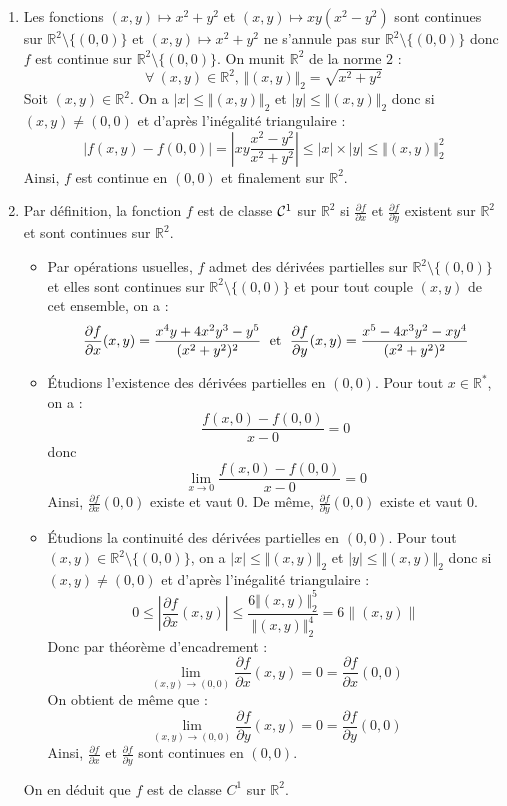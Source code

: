 \documentclass[a4paper,twoside,french,11pt]{VcCours}
\begin{document}
 \begin{enumerate}
 \item Les fonctions $(x,y)\mapsto x^2+y^2$ et $(x,y)\mapsto xy(x^2-y^2)$ sont continues sur  $\mathbb{R}^2 \setminus \{(0,0)\}$ et $(x,y)\mapsto x^2+y^2$ ne s'annule pas sur $\mathbb{R}^2 \setminus \{(0,0)\}$ donc $f$ est continue sur $\mathbb{R}^2\setminus\{(0,0)\}$. On munit $\mathbb{R}^2$ de la norme $2$ :
$$\forall\:(x,y)\in\mathbb{R}^2, \,  \Vert (x,y) \Vert_2 = \sqrt{x^2+y^2}$$
Soit $(x,y)\in\mathbb{R}^2$. On a $|x|\leq \Vert (x,y) \Vert_2$ et $|y|\leq \Vert (x,y) \Vert_2$ donc si $(x,y) \neq (0,0)$ et d'après l'inégalité triangulaire :
$$|f(x,y)-f(0,0)|=\left|xy\frac{x^2-y^2}{x^2+y^2}\right| \leq |x| \times |y|\leq \Vert (x,y) \Vert_2^2$$
Ainsi, $f$ est continue en $(0,0)$ et finalement sur $\mathbb{R}^2$.
\item Par définition, la fonction $f$ est de classe ${\cal C}^1$ sur $\mathbb{R}^2$ si $\frac{\partial f}{\partial x}$ et $\frac{\partial f}{\partial y}$ existent sur $\mathbb{R}^2$ et sont continues sur $\mathbb{R}^2$.
\begin{itemize}
\item Par opérations usuelles, $f$ admet des dérivées partielles sur $\mathbb{R}^2 \setminus \{(0,0)\}$ et elles sont continues sur $\mathbb{R}^2 \setminus \{(0,0)\}$ et pour tout couple $(x,y)$ de cet ensemble, on a :
$$\dfrac{\partial f}{\partial x}(x,y)=\dfrac{x^4y+4x^2y^3-y^5}{(x^2+y^2)^{2}} \; \hbox{ et } \; \dfrac{\partial f}{\partial y}(x,y)=\dfrac{x^5-4x^3y^2-xy^4}{(x^2+y^2)^{2}}$$
\item Étudions l'existence des dérivées partielles en $(0,0)$. Pour tout $x\in\mathbb{R}^*$, on a :
$$\frac{f(x,0)-f(0,0)}{x-0}=0$$
donc 
$$\lim\limits_{x\rightarrow 0}\frac{f(x,0)-f(0,0)}{x-0}=0$$
Ainsi, $\frac{\partial f}{\partial x}(0,0)$ existe et vaut $0$. De même, $\frac{\partial f}{\partial y}(0,0)$ existe et vaut $0$.
\item Étudions la continuité des dérivées partielles en $(0,0)$. Pour tout $(x,y)\in \mathbb{R}^2 \setminus \{(0,0)\}$, on a $|x|\leq \Vert (x,y) \Vert_2$ et $|y|\leq \Vert (x,y) \Vert_2$ donc si $(x,y) \neq (0,0)$ et d'après l'inégalité triangulaire :
$$ 0 \leq \left|\dfrac{\partial f}{\partial x}(x,y)\right|\leq \dfrac{6\Vert (x,y) \Vert_2^5}{\Vert (x,y) \Vert_2^4}=6\|(x,y)\|$$ 
Donc par théorème d'encadrement :
$$\lim\limits_{(x,y)\to (0,0)}\frac{\partial f}{\partial x}(x,y)=0=\frac{\partial f}{\partial x}(0,0)$$
On obtient de même que :
$$\lim\limits_{(x,y)\to (0,0)}\frac{\partial f}{\partial y}(x,y)=0=\frac{\partial f}{\partial y}(0,0)$$
Ainsi, $\frac{\partial f}{\partial x}$ et $\frac{\partial f}{\partial y}$ sont continues en $(0,0)$.
\end{itemize}
On en déduit que $f$ est de classe $C^1$ sur $\mathbb{R}^2$.
 \end{enumerate}
\end{document}
